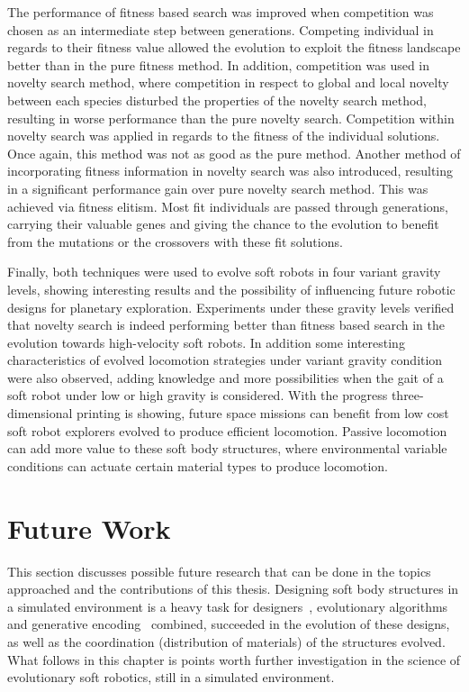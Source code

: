 The performance of fitness based search was improved when competition was chosen as an intermediate step between generations. Competing individual in regards to their fitness value allowed the evolution to exploit the fitness landscape better than in the pure fitness method. In addition, competition was used in novelty search method, where competition in respect to global and local novelty between each species disturbed the properties of the novelty search method, resulting in worse performance than the pure novelty search. Competition within novelty search was applied in regards to the fitness of the individual solutions. Once again, this method was not as good as the pure method. Another method of incorporating fitness information in novelty search was also introduced, resulting in a significant performance gain over pure novelty search method. This was achieved via fitness elitism. Most fit individuals are passed through generations, carrying their valuable genes and giving the chance to the evolution to benefit from the mutations or the crossovers with these fit solutions. 

Finally, both techniques were used to evolve soft robots in four variant gravity levels, showing interesting results and the possibility of influencing future robotic designs for planetary exploration. Experiments under these gravity levels verified that novelty search is indeed performing better than fitness based search in the evolution towards high-velocity soft robots. In addition some interesting characteristics of evolved locomotion strategies under variant gravity condition were also observed, adding knowledge and more possibilities when the gait of a soft robot under low or high gravity is considered. With the progress three-dimensional printing is showing, future space missions can benefit from low cost soft robot explorers evolved to produce efficient locomotion. Passive locomotion can add more value to these soft body structures, where environmental variable conditions can actuate certain material types to produce locomotion.

\section{Future Work} %

This section discusses possible future research that can be done in the topics approached and the contributions of this thesis. Designing soft body structures in a simulated environment is a heavy task for designers~\citep{cheney2013unshackling}, evolutionary algorithms~\citep{stanley2002evolving} and generative encoding~\citep{stanley2007compositional} combined, succeeded in the evolution of these designs, as well as the coordination (distribution of materials) of the structures evolved. What follows in this chapter is points worth further investigation in the science of evolutionary soft robotics, still in a simulated environment.

